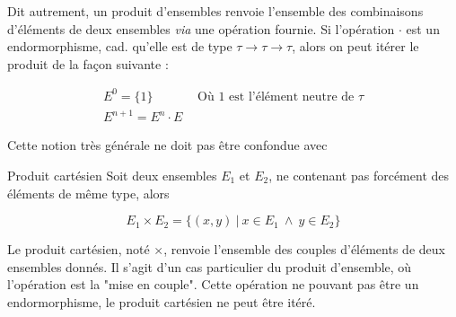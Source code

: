 Dit autrement, un produit d'ensembles renvoie l'ensemble des combinaisons d'éléments de deux ensembles \textit{via} une opération fournie. Si l'opération $\cdot$ est un endormorphisme, cad. qu'elle est de type $\tau \rightarrow \tau \rightarrow \tau$, alors on peut itérer le produit de la façon suivante :

\begin{eqnarray*}
E^0 = \{1\} ~~~~~~~~~~~~~~~~ \textrm{Où $1$ est l'élément neutre de $\tau$} \\
E^{n+1} = E^n \cdot E
\end{eqnarray*}

Cette notion très générale ne doit pas être confondue avec

\begin{definition}{Produit cartésien}{}
Soit deux ensembles $E_1$ et $E_2$, ne contenant pas forcément des éléments de même type, alors

\[
E_1 \times E_2 = \{(x,y)~|~x \in E_1~\wedge~y \in E_2\}
\]
\end{definition}

Le produit cartésien, noté $\times$, renvoie l'ensemble des couples d'éléments de deux ensembles donnés. Il s'agit d'un cas particulier du produit d'ensemble, où l'opération est la "mise en couple". Cette opération ne pouvant pas être un endormorphisme, le produit cartésien ne peut être itéré.

